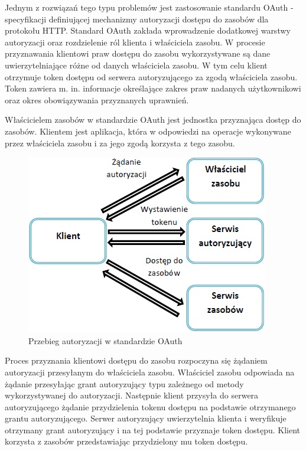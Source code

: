 		Jednym z rozwiązań tego typu problemów jest zastosowanie standardu OAuth - specyfikacji definiującej mechanizmy autoryzacji dostępu do zasobów dla protokołu HTTP\cite{Hardt12}. Standard OAuth zakłada wprowadzenie dodatkowej warstwy autoryzacji  oraz rozdzielenie ról klienta i właściciela zasobu. W procesie przyznawania klientowi praw dostępu do zasobu wykorzystywane są dane uwierzytelniające różne od danych właściciela zasobu. W tym celu klient otrzymuje token dostępu od serwera autoryzującego za zgodą właściciela zasobu. Token zawiera m. in. informacje określające zakres praw nadanych użytkownikowi oraz okres obowiązywania przyznanych uprawnień. 

		Właścicielem zasobów w standardzie OAuth jest jednostka przyznająca dostęp do zasobów. Klientem jest aplikacja, która w odpowiedzi na operacje wykonywane przez  właściciela zasobu i za jego zgodą korzysta z tego zasobu.

		\begin{figure}[h]
			\centering
				\includegraphics{img/oauth.jpg}
			\caption{Przebieg autoryzacji w standardzie OAuth}
			\label{Przebieg autoryzacji w standardzie OAuth}
		\end{figure}

		Proces przyznania klientowi dostępu do zasobu rozpoczyna się żądaniem autoryzacji przesyłanym do właściciela zasobu.  Właściciel zasobu odpowiada na żądanie przesyłając grant autoryzujący typu zależnego od metody wykorzystywanej do autoryzacji. Następnie klient przysyła do serwera autoryzującego żądanie przydzielenia tokenu dostępu na podstawie otrzymanego grantu autoryzującego. Serwer autoryzujący uwierzytelnia klienta i weryfikuje otrzymany grant autoryzujący i na tej podstawie przyznaje token dostępu. Klient korzysta z zasobów przedstawiając przydzielony mu token dostępu.


